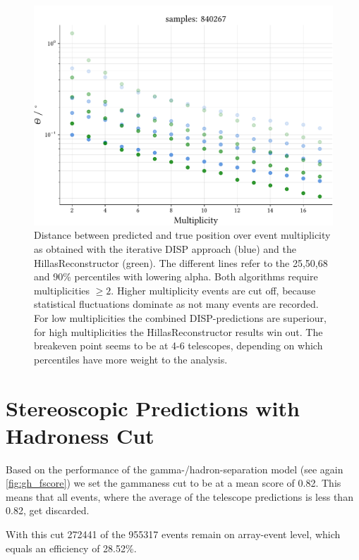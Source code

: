 \begin{figure}
    \centering
    \captionsetup{width=0.9\linewidth}
    \includegraphics[width=0.9\linewidth]{../analysis/plots/gamma/pairwise_median_100_vs_multi_comp.pdf}
    \caption{Distance between predicted and true position over event multiplicity as obtained with
    the iterative DISP approach (blue) and the HillasReconstructor (green).
    The different lines refer to the 25,50,68 and 90\% percentiles with 
    lowering alpha.
    Both algorithms require
    multiplicities $\geq 2$. Higher multiplicity events are cut off, because 
    statistical fluctuations dominate as not many events are recorded.
    For low multiplicities the combined DISP-predictions are superiour, 
    for high multiplicities the HillasReconstructor results win out.
    The breakeven point seems to be at 4-6 telescopes, depending on 
    which percentiles have more weight to the analysis.}
    \label{fig:stereo_magic_multi}
\end{figure}


\section{Stereoscopic Predictions with Hadroness Cut}

Based on the performance of the gamma-/hadron-separation model 
(see again \ref{fig:gh_fscore})
we set the gammaness cut to be at a mean score of \num{0.82}.
This means that all events, where the average of the telescope predictions
is less than \num{0.82}, get discarded.

With this cut \num{272441} of the \num{955317} events remain on array-event level, 
which equals an efficiency of \num{28.52}\%.


